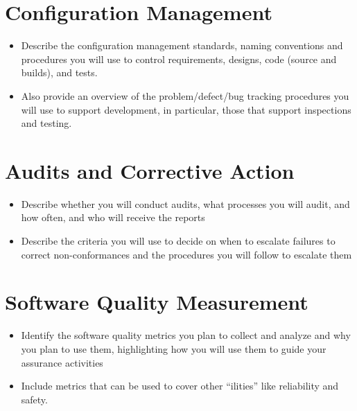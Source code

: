 \documentclass[11pt]{report}
\begin{document}
\chapter{Configuration Management}
\begin{itemize}
\item Describe the configuration management standards, naming conventions and procedures you will
  use to control requirements, designs, code (source and builds), and tests.
\item Also provide an overview of the problem/defect/bug tracking procedures you will use to support
  development, in particular, those that support inspections and testing.
\end{itemize}


\chapter{Audits and Corrective Action}
\begin{itemize}
\item Describe whether you will conduct audits, what processes you will audit, and how often, and
  who will receive the reports
\item Describe the criteria you will use to decide on when to escalate failures to correct
  non-conformances and the procedures you will follow to escalate them
\end{itemize}




\chapter{Software Quality Measurement}
\begin{itemize}
\item Identify the software quality metrics you plan to collect and analyze and why you plan to use
  them, highlighting how you will use them to guide your assurance activities
\item Include metrics that can be used to cover other “ilities” like reliability and safety.
\end{itemize}



\end{document}

